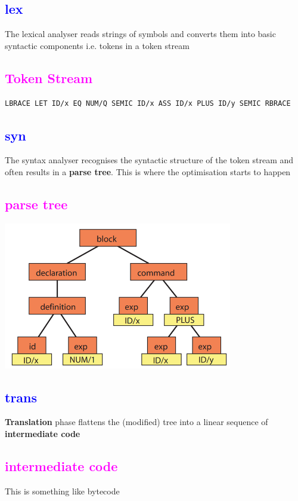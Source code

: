 \documentclass{article}[18pt]
\begin{document}
\subsection{\textcolor{blue}{lex}}
The lexical analyser reads strings of symbols and converts them into basic syntactic components i.e. tokens in a token stream
\subsection{\textcolor{magenta}{Token Stream}}
\begin{lstlisting}[mathescape=true]
LBRACE LET ID/x EQ NUM/Q SEMIC ID/x ASS ID/x PLUS ID/y SEMIC RBRACE
\end{lstlisting}
\subsection{\textcolor{blue}{syn}} 
The syntax analyser recognises the syntactic structure of the token stream and often results in a \textbf{parse tree}. This is where the optimisation starts to happen
\subsection{\textcolor{magenta}{parse tree}}
\begin{center}
\includegraphics[width=10cm]{parsetree.png}
\end{center}
\subsection{\textcolor{blue}{trans}}
\textbf{Translation} phase flattens the (modified) tree into a linear sequence of \textbf{intermediate code}
\subsection{\textcolor{magenta}{intermediate code}}
This is something like bytecode
\end{document}
